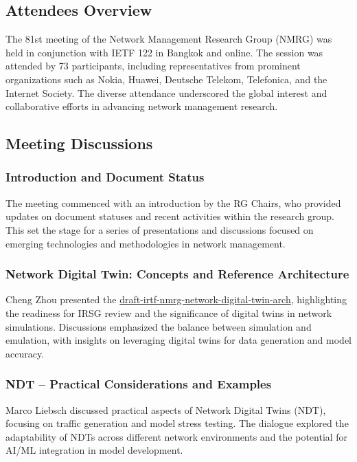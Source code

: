 \documentclass{article}
\begin{document}
\subsection{Attendees Overview}
The 81st meeting of the Network Management Research Group (NMRG) was held in conjunction with IETF 122 in Bangkok and online. The session was attended by 73 participants, including representatives from prominent organizations such as Nokia, Huawei, Deutsche Telekom, Telefonica, and the Internet Society. The diverse attendance underscored the global interest and collaborative efforts in advancing network management research.

\subsection{Meeting Discussions}

\subsubsection{Introduction and Document Status}
The meeting commenced with an introduction by the RG Chairs, who provided updates on document statuses and recent activities within the research group. This set the stage for a series of presentations and discussions focused on emerging technologies and methodologies in network management.

\subsubsection{Network Digital Twin: Concepts and Reference Architecture}
Cheng Zhou presented the \href{https://datatracker.ietf.org/doc/html/draft-irtf-nmrg-network-digital-twin-arch}{draft-irtf-nmrg-network-digital-twin-arch}, highlighting the readiness for IRSG review and the significance of digital twins in network simulations. Discussions emphasized the balance between simulation and emulation, with insights on leveraging digital twins for data generation and model accuracy.

\subsubsection{NDT – Practical Considerations and Examples}
Marco Liebsch discussed practical aspects of Network Digital Twins (NDT), focusing on traffic generation and model stress testing. The dialogue explored the adaptability of NDTs across different network environments and the potential for AI/ML integration in model development.
\end{document}
